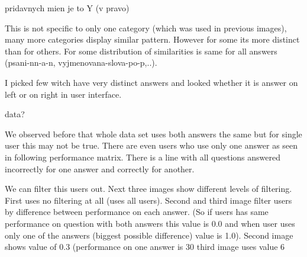 \documentclass[
  digital, %
  table,   %
  nolof,     %
  nolot,     %
  nocover
]{fithesis3}
\begin{document}
pridavnych mien je to Y (v pravo)

This is not specific to only one category (which was used in previous
images), many more categories display similar pattern. However for some
its more distinct than for others. For some distribution of similarities
is same for all answers (psani-nn-a-n, vyjmenovana-slova-po-p,..).

I picked few witch have very distinct answers and looked whether it is
answer on left or on right in user interface.


data?


We observed before that whole data set uses both answers the same but
for single user this may not be true. There are even users who use only
one answer as seen in following performance matrix. There is a line with
all questions answered incorrectly for one answer and correctly for
another.


We can filter this users out. Next three images show different levels of
filtering. First uses no filtering at all (uses all users). Second and
third image filter users by difference between performance on each
answer. (So if users has same performance on question with both answers
this value is 0.0 and when user uses only one of the answers (biggest
possible difference) value is 1.0). Second image shows value of 0.3
(performance on one answer is 30%
third image uses value 6%
\end{document}
